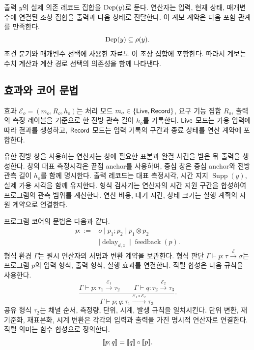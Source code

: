출력 $y$의 실제 의존 레코드 집합을 $\operatorname{Dep}(y)$로 둔다.
연산자는 입력, 현재 상태, 매개변수에 연결된 조상 집합을 출력과 다음 상태로 전달한다.
이 계보 계약은 다음 포함 관계를 만족한다.
\begin{equation}
 \operatorname{Dep}(y)\subseteq\rho(y).
 \label{eq:lineage-inclusion}
\end{equation}
조건 분기와 매개변수 선택에 사용한 자료도 이 조상 집합에 포함한다.
따라서 계보는 수치 계산과 계산 경로 선택의 의존성을 함께 나타낸다.

\subsection{효과와 코어 문법}

\begin{definition}[연산 효과]
효과 $\mathcal E_o=(m_o,R_o,h_o)$는 처리 모드
$m_o\in\{\mathsf{Live},\mathsf{Record}\}$, 요구 기능 집합 $R_o$,
출력의 측정 레이블을 기준으로 한 전방 관측 길이 $h_o$를 기록한다.
$\mathsf{Live}$ 모드는 가용 입력에 따라 결과를 생성하고, $\mathsf{Record}$ 모드는
입력 기록의 구간과 종료 상태를 연산 계약에 포함한다.
\end{definition}

유한 전방 창을 사용하는 연산자는 창에 필요한 표본과 완결 사건을 받은 뒤 출력을 생성한다.
창의 대표 측정시각은 끝점 anchor를 사용하며, 중심 창은 중심 anchor와
전방 관측 길이 $h_o$를 함께 명시한다.
출력 레코드는 대표 측정시각, 시간 지지 $\operatorname{Supp}(y)$,
실제 가용 시각을 함께 유지한다.
형식 검사기는 연산자의 시간 지원 구간을 합성하여 프로그램의 관측 범위를 계산한다.
연산 비용, 대기 시간, 상태 크기는 실행 계획의 자원 계약으로 연결한다.

프로그램 코어의 문법은 다음과 같다.
\begin{equation}
 \begin{aligned}
 p::={}&o\mid p_1;p_2\mid p_1\otimes p_2\\
       &\mid\operatorname{delay}_{d,z}
        \mid\operatorname{feedback}(p).
 \end{aligned}
 \label{eq:core-grammar}
\end{equation}
형식 환경 $\Gamma$는 원시 연산자의 서명과 변환 계약을 보관한다.
형식 판단 $\Gamma\vdash p:\tau\xrightarrow{\mathcal E}\sigma$는
프로그램 $p$의 입력 형식, 출력 형식, 실행 효과를 연결한다.
직렬 합성은 다음 규칙을 사용한다.
\begin{equation}
 \frac{
 \Gamma\vdash p:\tau_1\xrightarrow{\mathcal E_1}\tau_2
 \qquad
 \Gamma\vdash q:\tau_2\xrightarrow{\mathcal E_2}\tau_3
 }{
 \Gamma\vdash p;q:\tau_1
 \xrightarrow{\mathcal E_1\circ\mathcal E_2}\tau_3
 }.
 \label{eq:typing-sequential}
\end{equation}
공유 형식 $\tau_2$는 채널 순서, 측정량, 단위, 시계, 발생 규칙을 일치시킨다.
단위 변환, 재기준화, 재표본화, 시계 변환은 각각의 입력과 출력을 가진
명시적 연산자로 연결한다.
직렬 의미는 함수 합성으로 정의한다.
\begin{equation}
 \mathopen{[\![}p;q\mathclose{]\!]}=\mathopen{[\![}q\mathclose{]\!]}\circ\mathopen{[\![}p\mathclose{]\!]}.
\end{equation}

